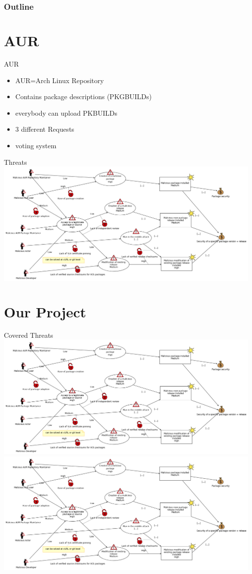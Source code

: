 \documentclass{beamer}
\title{}
\author{Lukas Krismer \& Bennett Piater}
\institute{QE - Universität Innsbruck}
\date{\today}
\begin{document}
\maketitle

\begin{frame}
	\frametitle{Outline}
	\tableofcontents
\end{frame}

\section{AUR}

\begin{frame}{AUR}
\begin{itemize}
	\item AUR=Arch Linux Repository
	\item Contains package descriptions (PKGBUILDs)
	\item everybody can upload PKBUILDs
	\item 3 different Requests
	\item voting system
\end{itemize}
\end{frame}

\begin{frame}{Threats}
\includegraphics[width=\textwidth]{threat.png}
\note{}
\end{frame}

\section{Our Project}

\begin{frame}{Covered Threats}
\includegraphics<1>[width=\textwidth]{threat.png}
\includegraphics<2>[width=\textwidth]{threat.png} %
\end{frame}
\end{document}
